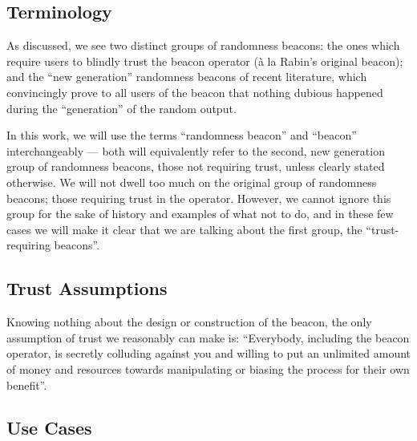 

\subsection{Terminology}
As discussed, we see two distinct groups of randomness beacons: the ones which require users to blindly trust the beacon operator (à la Rabin's original beacon); and the \enquote{new generation} randomness beacons of recent literature, which convincingly prove to all users of the beacon that nothing dubious happened during the \enquote{generation} of the random output.

In this work, we will use the terms \enquote{randomness beacon} and \enquote{beacon} interchangeably --- both will equivalently refer to the second, new generation group of randomness beacons, those not requiring trust, unless clearly stated otherwise.
We will not dwell too much on the original group of randomness beacons; those requiring trust in the operator.
However, we cannot ignore this group for the sake of history and examples of what not to do, and in these few cases we will make it clear that we are talking about the first group, the \enquote{trust-requiring beacons}.

\subsection{Trust Assumptions}
Knowing nothing about the design or construction of the beacon, the only assumption of trust we reasonably can make is:
\enquote{Everybody, including the beacon operator, is secretly colluding against you and willing to put an unlimited amount of money and resources towards manipulating or biasing the process for their own benefit}.


\subsection{Use Cases}

